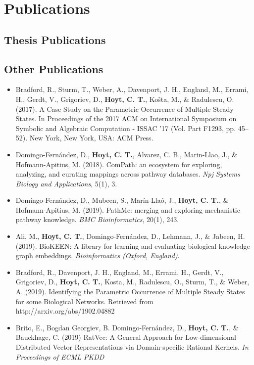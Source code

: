 \chapter*{Publications}

\section*{Thesis Publications}



\section*{Other Publications}

\begin{itemize}
    \item Bradford, R., Sturm, T., Weber, A., Davenport, J. H., England, M., Errami, H., Gerdt, V., Grigoriev, D., \textbf{Hoyt, C. T.}, Košta, M., \& Radulescu, O. (2017). A Case Study on the Parametric Occurrence of Multiple Steady States. In Proceedings of the 2017 ACM on International Symposium on Symbolic and Algebraic Computation - ISSAC ’17 (Vol. Part F1293, pp. 45–52). New York, New York, USA: ACM Press.
    \item Domingo-Fern\'{a}ndez, D., \textbf{Hoyt, C. T.}, Alvarez, C. B., Marin-Llao, J., \& Hofmann-Apitius, M. (2018). ComPath: an ecosystem for exploring, analyzing, and curating mappings across pathway databases. \textit{Npj Systems Biology and Applications}, 5(1), 3.
    \item Domingo-Fern\'{a}ndez, D., Mubeen, S., Marín-Llaó, J., \textbf{Hoyt, C. T.}, \& Hofmann-Apitius, M. (2019). PathMe: merging and exploring mechanistic pathway knowledge. \textit{BMC Bioinformatics}, 20(1), 243.
    \item Ali, M., \textbf{Hoyt, C. T.}, Domingo-Fern\'{a}ndez, D., Lehmann, J., \& Jabeen, H. (2019). BioKEEN: A library for learning and evaluating biological knowledge graph embeddings. \textit{Bioinformatics (Oxford, England)}.
    \item Bradford, R., Davenport, J. H., England, M., Errami, H., Gerdt, V., Grigoriev, D., \textbf{Hoyt, C. T.}, Kosta, M., Radulescu, O., Sturm, T., \& Weber, A. (2019). Identifying the Parametric Occurrence of Multiple Steady States for some Biological Networks. Retrieved from http://arxiv.org/abs/1902.04882
    \item Brito, E., Bogdan Georgiev, B. Domingo-Fern\'{a}ndez, D., \textbf{Hoyt, C. T.}, \& Bauckhage, C. (2019) RatVec: A General Approach for Low-dimensional Distributed Vector Representations via Domain-specific Rational Kernels. \textit{In Proceedings of ECML PKDD}

\end{itemize}
